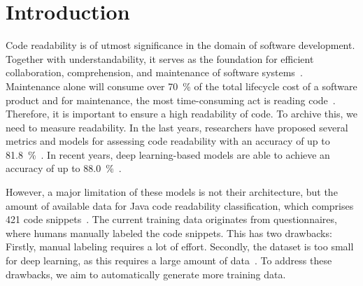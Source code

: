 \documentclass[%
class=scrreprt,
chapterprefix=false,%
open=right,%
twoside=false,%
paper=a4,%
logofile={Logo\_zentral\_farbig\_EN.png},%
thesistype=master,%
UKenglish,%
]{se2thesis}
\theoremstyle{definition}
\newcommand{\citeclassicmodels}{\cite{buse2009learning, posnett2011simpler, dorn2012general, scalabrino2018comprehensive}\xspace}
\newcommand{\citedeepmodels}{\cite{mi2018inception, mi2018improving, sharma2020egan, mi2022towards, mi2022rank, mi2023graph}\xspace}
\newcommand{\citeolddataset}{\cite{buse2009learning, dorn2012general, scalabrino2018comprehensive}\xspace}
\begin{document}
	\mainmatter
	
	\tableofcontents

\pagebreak
\section{Introduction} \label{Introduction}

	Code readability is of utmost significance in the domain of software development.
	Together with understandability, it serves as the foundation for efficient collaboration, comprehension, and maintenance of software systems~\cite{posnett2011simpler, aggarwal2002integrated}. 
	Maintenance alone will consume over 70~\% of the total lifecycle cost of a software product and for maintenance, the most time-consuming act is reading code~\cite{buse2009learning, deimel1985uses, rugaber2000use, boehm2001defect}.
	Therefore, it is important to ensure a high readability of code. To archive this, we need to measure readability.
	In the last years, researchers have proposed several metrics and models for assessing code readability with an accuracy of up to 81.8~\%~\citeclassicmodels. In recent years, deep learning-based models are able to achieve an accuracy of up to 88.0~\%~\citedeepmodels.
	
	However, a major limitation of these models is not their architecture, but the amount of available data for Java code readability classification, which comprises 421 code snippets~\citeolddataset. The current training data originates from questionnaires, where humans manually labeled the code snippets. This has two drawbacks: Firstly, manual labeling requires a lot of effort.
	Secondly, the dataset is too small for deep learning, as this requires a large amount of data~\cite{hestness2017deep}.
	To address these drawbacks, we aim to automatically generate more training data.
	
	
\end{document}
